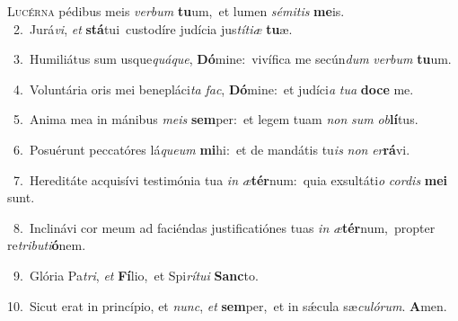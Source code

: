 \lettrine{\initial\textcolor{\initialcolor}{L}}{ucérna} pédibus meis \textit{ver}\-\textit{bum} \textbf{tu}\-um,~\star et lumen \textit{sé}\-\textit{mi}\textit{tis} \textbf{me}\-is.\\
{\numbfont\textcolor{\numbcolor}{~2.}}~Jurá\-\textit{vi}\-, \textit{et} \textbf{stá}\-tui~\star custodíre judícia jus\-\textit{tí}\-\textit{ti}\textit{æ} \textbf{tu}\-æ.\par
{\numbfont\textcolor{\numbcolor}{~3.}}~Humiliátus sum usque\-\textit{quá}\-\textit{que}, \textbf{Dó}\-mine:~\star vivífica me secún\textit{dum} \textit{ver}\-\textit{bum} \textbf{tu}\-um.\par
{\numbfont\textcolor{\numbcolor}{~4.}}~Voluntária oris mei benepláci\textit{ta} \textit{fac}\-, \textbf{Dó}\-mine:~\star et judíci\textit{a} \textit{tu}\-\textit{a} \textbf{do}\-\textbf{ce} me.\par
{\numbfont\textcolor{\numbcolor}{~5.}}~Anima mea in mánibus \textit{me}\-\textit{is} \textbf{sem}\-per:~\star et legem tuam \textit{non} \textit{sum} \textit{ob}\-\textbf{lí}tus.\par
{\numbfont\textcolor{\numbcolor}{~6.}}~Posuérunt peccatóres lá\-\textit{que}\-\textit{um} \textbf{mi}\-hi:~\star et de mandátis tu\textit{is} \textit{non} \textit{er}\-\textbf{rá}vi.\par
{\numbfont\textcolor{\numbcolor}{~7.}}~Hereditáte acquisívi testimónia tua \textit{in} \textit{æ}\-\textbf{tér}num:~\star quia exsultáti\textit{o} \textit{cor}\-\textit{dis} \textbf{me}\-\textbf{i} sunt.\par
{\numbfont\textcolor{\numbcolor}{~8.}}~Inclinávi cor meum ad faciéndas justificatiónes tuas \textit{in} \textit{æ}\-\textbf{tér}num,~\star propter re\-\textit{tri}\-\textit{bu}\textit{ti}\textbf{ó}nem.\par
{\numbfont\textcolor{\numbcolor}{~9.}}~Glória Pa\-\textit{tri}\-, \textit{et} \textbf{Fí}\-lio,~\star et Spi\-\textit{rí}\-\textit{tu}\textit{i} \textbf{Sanc}\-to.\par
{\numbfont\textcolor{\numbcolor}{10.}}~Sicut erat in princípio, et \textit{nunc}\-, \textit{et} \textbf{sem}\-per,~\star et in sǽcula sæ\-\textit{cu}\-\textit{ló}\textit{rum}. \textbf{A}\-men.\par
